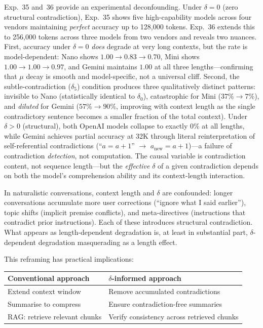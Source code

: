 \documentclass[11pt,a4paper]{article}
\begin{document}
Exp.~35 and~36 provide an experimental deconfounding. Under $\delta = 0$ (zero structural contradiction), Exp.~35 shows five high-capability models across four vendors maintaining \emph{perfect} accuracy up to 128{,}000 tokens. Exp.~36 extends this to 256{,}000 tokens across three models from two vendors and reveals two nuances. First, accuracy under $\delta = 0$ \emph{does} degrade at very long contexts, but the rate is model-dependent: Nano shows $1.00 \to 0.83 \to 0.70$, Mini shows $1.00 \to 1.00 \to 0.97$, and Gemini maintains $1.00$ at all three lengths---confirming that $\mu$ decay is smooth and model-specific, not a universal cliff. Second, the subtle-contradiction ($\delta_5$) condition produces three qualitatively distinct patterns: invisible to Nano (statistically identical to $\delta_0$), catastrophic for Mini ($37\% \to 7\%$), and \emph{diluted} for Gemini ($57\% \to 90\%$, improving with context length as the single contradictory sentence becomes a smaller fraction of the total context). Under $\delta > 0$ (structural), both OpenAI models collapse to exactly $0\%$ at all lengths, while Gemini achieves partial accuracy at 32K through literal reinterpretation of self-referential contradictions (``$a = a + 1$'' $\to$ $a_{\text{new}} = a + 1$)---a failure of contradiction \emph{detection}, not computation. The causal variable is contradiction content, not sequence length---but the \emph{effective} $\delta$ of a given contradiction depends on both the model's comprehension ability and its context-length interaction.

In naturalistic conversations, context length and $\delta$ are confounded: longer conversations accumulate more user corrections (``ignore what I said earlier''), topic shifts (implicit premise conflicts), and meta-directives (instructions that contradict prior instructions). Each of these introduces structural contradiction. What appears as length-dependent degradation is, at least in substantial part, $\delta$-dependent degradation masquerading as a length effect.

This reframing has practical implications:

\begin{center}
\small
\begin{tabular}{ll}
\toprule
\textbf{Conventional approach} & \textbf{$\delta$-informed approach} \\
\midrule
Extend context window & Remove accumulated contradictions \\
Summarise to compress & Ensure contradiction-free summaries \\
RAG: retrieve relevant chunks & Verify consistency across retrieved chunks \\
\bottomrule
\end{tabular}
\end{center}
\end{document}
